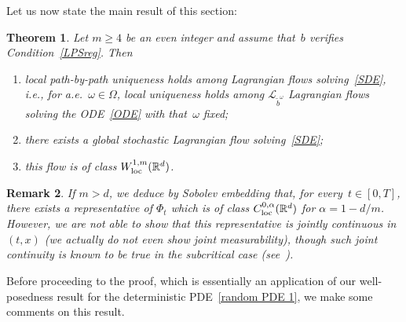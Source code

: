 \documentclass[a4paper,10pt]{article}
\newtheorem{theorem}{Theorem}[section]
\newtheorem{remark}[theorem]{Remark}
\newcommand\1{\mathbbm{1}}
\newcommand{\mr}{\mathbb{R}}
\newcommand{\mc}{\mathcal}
\newcommand{\td}{\tilde}
\newcommand\loc{{\rm loc}}
\numberwithin{equation}{section}
\begin{document}
Let us now state the main result of this section:

\begin{theorem}\label{main thm flows}
Let $m \geq 4$ be an even integer and assume that~$b$ verifies Condition~\ref{LPSreg}. Then  
\begin{enumerate}[font=\normalfont]
\item local path-by-path uniqueness holds among Lagrangian flows solving~\eqref{SDE}, i.e., for a.e.~$\omega \in \Omega$, local uniqueness holds among $\mc{L}_{\td{b}^\omega}$ Lagrangian flows solving the ODE~\eqref{ODE} with that~$\omega$ fixed; 
\item there exists a global stochastic Lagrangian flow solving~\eqref{SDE};
\item this flow is of class $W^{1,m}_{\loc}(\mr^d)$.
\end{enumerate}
\end{theorem}

\begin{remark}
If $m>d$, we deduce by Sobolev embedding that, for every~$t \in [0,T]$, there exists a representative of $\Phi_t$ which is of class $C^{0,\alpha}_{\loc}(\mr^d)$ for $\alpha=1-d/m$. However, we are not able to show that this representative is jointly continuous in $(t,x)$ \textup{(}we actually do not even show joint measurability\textup{)}, though such joint continuity is known to be true in the subcritical case \textup{(}see~\textup{\cite{FeFl11}}\textup{)}.
\end{remark}

Before proceeding to the proof, which is essentially an application of our well-posedness result for the deterministic PDE~\eqref{random PDE 1}, we make some comments on this result. 
\end{document}
